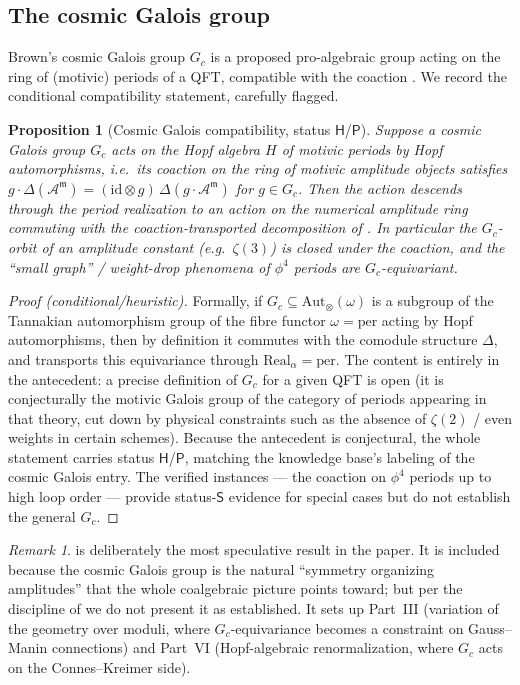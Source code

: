 \documentclass[12pt]{article}
\newtheorem{proposition}[theorem]{Proposition}
\theoremstyle{definition}
\theoremstyle{remark}
\newtheorem{remark}[theorem]{Remark}
\newcommand{\Real}{\mathrm{Real}}
\newcommand{\per}{\mathrm{per}}
\newcommand{\Amm}{\mathcal{A}^{\mathfrak{m}}}
\newcommand{\coA}{\Delta}
\newcommand{\Slab}{\ensuremath{\mathsf{S}}}
\newcommand{\Hlab}{\ensuremath{\mathsf{H}}}
\newcommand{\Plab}{\ensuremath{\mathsf{P}}}
\begin{document}
\subsection{The cosmic Galois group}

Brown's cosmic Galois group $G_c$ is a proposed pro-algebraic group acting on the ring of
(motivic) periods of a QFT, compatible with the coaction \cite{BrownCosmic, BrownPeriods}.
We record the conditional compatibility statement, carefully flagged.

\begin{proposition}[Cosmic Galois compatibility, status \Hlab/\Plab]
\label{prop:cosmic}
Suppose a cosmic Galois group $G_c$ acts on the Hopf algebra $H$ of motivic periods by Hopf
automorphisms, i.e.\ its coaction on the ring of motivic amplitude objects satisfies
$g\cdot\coA(\Amm)=(\mathrm{id}\otimes g)\,\coA(g\cdot\Amm)$ for $g\in G_c$. Then the action
descends through the period realization to an action on the numerical amplitude ring
commuting with the coaction-transported decomposition of . In particular the
$G_c$-orbit of an amplitude constant (e.g.\ $\zeta(3)$) is closed under the coaction, and the
``small graph'' / weight-drop phenomena of $\phi^4$ periods are $G_c$-equivariant.
\end{proposition}

\begin{proof}[Proof (conditional/heuristic)]
Formally, if $G_c\subseteq\mathrm{Aut}_\otimes(\omega)$ is a subgroup of the Tannakian
automorphism group of the fibre functor $\omega=\per$ acting by Hopf automorphisms, then by
definition it commutes with the comodule structure $\coA$, and  transports this
equivariance through $\Real_\alpha=\per$. The content is entirely in the antecedent: a precise
definition of $G_c$ for a given QFT is open (it is conjecturally the motivic Galois group of
the category of periods appearing in that theory, cut down by physical constraints such as the
absence of $\zeta(2)$ / even weights in certain schemes). Because the antecedent is
conjectural, the whole statement carries status \Hlab/\Plab, matching the knowledge base's
labeling of the cosmic Galois entry. The verified instances --- the coaction on $\phi^4$
periods up to high loop order \cite{PanzerSchnetz} --- provide status-\Slab{} evidence for
special cases but do not establish the general $G_c$.
\end{proof}

\begin{remark}
 is deliberately the most speculative result in the paper. It is included
because the cosmic Galois group is the natural ``symmetry organizing amplitudes'' that the
whole coalgebraic picture points toward; but per the discipline of  we do
not present it as established. It sets up Part~III (variation of the geometry over moduli,
where $G_c$-equivariance becomes a constraint on Gauss--Manin connections) and Part~VI
(Hopf-algebraic renormalization, where $G_c$ acts on the Connes--Kreimer side).
\end{remark}
\end{document}

